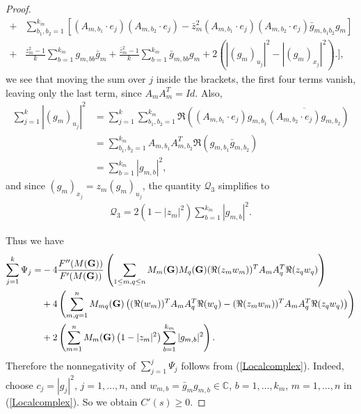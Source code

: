 \documentclass[10pt,a4paper]{amsart}
\begin{document}
\begin{proof}
\begin{align*}
			+&\sum_{b_1, b_2=1}^{k_m}\left[(A_{m,b_1}\cdot e_j) (A_{m,b_2}\cdot e_j)-\bar{z}_m^2(A_{m,b_1}\cdot e_j) (A_{m,b_2}\cdot e_j)\bar{g}_{m,b_1b_2}g_m\right]\\
			+&\frac{z_m^2-1}{k}\sum_{b=1}^{k_m}g_{m,bb}\bar{g}_m +\frac{\bar{z}_m^2-1}{k}\sum_{b=1}^{k_m}\bar{g}_{m,bb}g_m+2(|(g_m)_{u_j}|^2 -|(g_m)_{x_j}|^2)\Bigg.\Bigg],
		\end{align*}
		we see that  moving the sum over $j$ inside the brackets, the first four terms vanish, leaving only the last term, since $A_mA^T_m=Id$. Also,
		\begin{align*}
			\sum_{j=1}^k|(g_m)_{u_j}|^2&=\sum_{j=1}^k\sum_{b_1, b_2=1}^{k_m}\Re((A_{m,b_1}\cdot e_j)g_{m,b_1}\overline{(A_{m,b_2}\cdot e_j)g_{m,b_2}})\\
			&=\sum_{b_1, b_2=1}^{k_m} A_{m,b_1}A_{m,b_2}^T\Re(g_{m,b_1}\bar{g}_{m,b_2})\\
			&=\sum_{b=1}^{k_m}|g_{m,b}|^2,
		\end{align*}
		and since $(g_m)_{x_j}=z_m(g_m)_{u_j}$, the quantity $	\mathcal{Q}_3$ simplifies to 
		\begin{align*}
			\mathcal{Q}_3=2\left(1-|z_m|^2 \right)\sum_{b=1}^{k_m}|g_{m,b}|^2.
		\end{align*}

        Thus we have 
        	\begin{align*}		\sum_{j=1}^k\Psi_j=&-4\frac{F''(M({\bf{G}}))}{F'(M({\bf{G}}))}\left(\sum_{1\leq m,q\leq n}  M_{m}({\bf{G}})M_{q}({\bf{G}}) (\Re(z_mw_{m}))^T A_{m} A_{q}^T  \Re(z_qw_{q})  \right)\\
			&+4\left(\sum_{ m, q=1}^{n} M_{mq}({\bf{G}})\left( (\Re(w_{m}))^T A_{m} A_{q}^T  \Re(w_{q})  -  (\Re(z_mw_{m}))^T A_{m} A_{q}^T  \Re(z_qw_{q}) \right)\right)\\
			&+2\left(\sum_{m=1}^n M_{m}({\bf{G}})\left(1-|z_m|^2 \right)\sum_{b=1}^{k_m}|g_{m,b}|^2 \right).
		\end{align*}
        Therefore the nonnegativity of $\sum_{j=1}^{j}\Psi_{j}$ follows from (\ref{Localcomplex}). Indeed, choose $c_{j} = |g_{j}|^{2}$, $j=1,\ldots, n$,  and $w_{m,b} = \bar{g}_{m}g_{m,b} \in \mathbb{C}$, $b=1, \ldots, k_{m}$, $m=1, \ldots, n$ in (\ref{Localcomplex}). 
	So we obtain $C'(s) \geq 0$. 



\end{proof}
\end{document}
